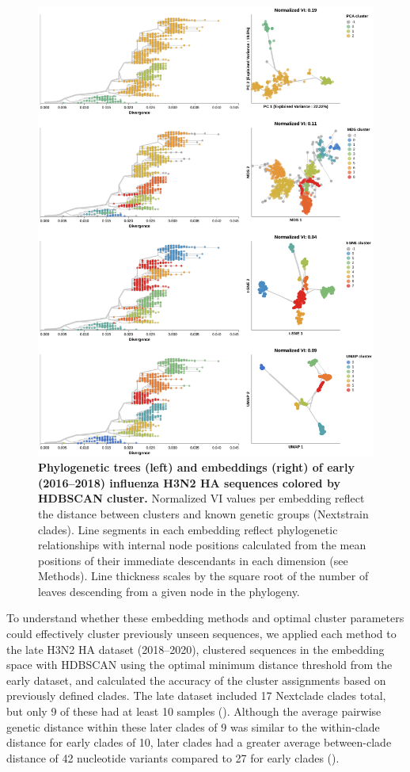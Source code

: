 \documentclass[10pt,letterpaper]{article}
\begin{document}
\begin{figure}[!h]
\includegraphics[width=\columnwidth]{figures/flu-2016-2018-ha-embeddings-by-cluster.png}
\caption{{\bf Phylogenetic trees (left) and embeddings (right) of early (2016--2018) influenza H3N2 HA sequences colored by HDBSCAN cluster.}
  Normalized VI values per embedding reflect the distance between clusters and known genetic groups (Nextstrain clades).
  Line segments in each embedding reflect phylogenetic relationships with internal node positions calculated from the mean positions of their immediate descendants in each dimension (see Methods).
  Line thickness scales by the square root of the number of leaves descending from a given node in the phylogeny.}
\label{fig:seasonal-influenza-h3n2-ha-2016-2018-clusters}
\end{figure}

To understand whether these embedding methods and optimal cluster parameters could effectively cluster previously unseen sequences, we applied each method to the late H3N2 HA dataset (2018--2020), clustered sequences in the embedding space with HDBSCAN using the optimal minimum distance threshold from the early dataset, and calculated the accuracy of the cluster assignments based on previously defined clades.
The late dataset included 17 Nextclade clades total, but only 9 of these had at least 10 samples ().
Although the average pairwise genetic distance within these later clades of 9 was similar to the within-clade distance for early clades of 10, later clades had a greater average between-clade distance of 42 nucleotide variants compared to 27 for early clades  ().
\end{document}
